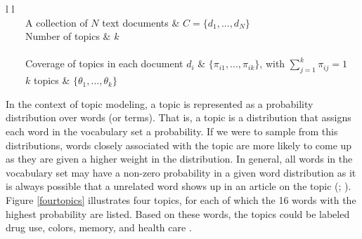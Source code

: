 \documentclass[11pt,a4paper,english,oneside]{book}
\newcommand{\tabitem}{~~\llap{\textbullet}~~}
\numberwithin{equation}{chapter}
\begin{document}
\begin{table}[h] %
	\centering %
	\begin{tabular}{ l  l  } %
		\toprule %
		 \\
		\midrule %
		\tabitem A collection of $N$  text documents & $C=\{d_1,...,d_N\}$ \\
		\tabitem Number of topics & $k$ \\
		\midrule
		 \\
		\midrule
		\tabitem Coverage of topics in each document $d_i$ & $\{\pi_{i1}, ..., \pi_{ik}\}$, with $\sum_{j=1}^{k} \pi_{ij} = 1$\\
		\tabitem $k$ topics & $\{\theta_1, ..., \theta_k\}$\\ %
		\bottomrule %
	\end{tabular}
	\caption{Formal definition of topic modeling task.} %
	\label{tab:task} %
\end{table}

In the context of topic modeling, a topic is represented as a probability distribution over words (or terms). That is, a topic is a distribution that assigns each word in the vocabulary set a probability. If we were to sample from this distributions, words closely associated with the topic are more likely to come up as they are given a higher weight in the distribution. In general, all words in the vocabulary set may have a non-zero probability in a given word distribution as it is always possible that a unrelated word shows up in an article on the topic (\citealt[pp.~335--337]{Zhai.2016}; \citealt[p.~994]{Blei.2003}). Figure \ref{fourtopics} illustrates four topics, for each of which the 16 words with the highest probability are listed. Based on these words, the topics could be labeled drug use, colors, memory, and health care \cite[p.2]{Steyvers(2007)}.  
\end{document}
